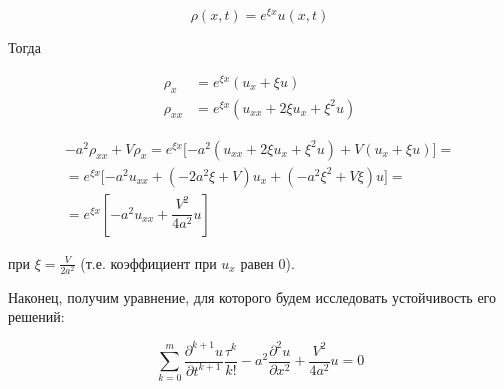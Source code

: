 \begin{equation*}
\rho (x,t) = e^{\xi x} u(x,t)
\end{equation*}

Тогда

\begin{align*}
\rho_x & = e^{\xi x} (u_x + \xi u)\\
\rho_{xx} & = e^{\xi x} (u_{xx} + 2 \xi u_x + \xi^2 u)
\end{align*}

\begin{align*}
- a^2 \rho_{xx} + V \rho_x = e^{\xi x} \lbrack -a^2 (u_{xx} + 2 \xi u_x + \xi^2 u) + V (u_x + \xi u) \rbrack = \\
= e^{\xi x} \lbrack -a^2 u_{xx} + (-2 a^2 \xi + V) u_x + (-a^2 \xi^2 + V \xi) u \rbrack = \\
= e^{\xi x} \left\lbrack -a^2 u_{xx} + \dfrac{V^2}{4a^2} u \right\rbrack
\end{align*}

при $\xi = \frac{V}{2a^2}$ (т.е. коэффициент при $u_x$ равен $0$).

Наконец, получим уравнение, для которого будем исследовать устойчивость его решений:

\begin{equation}\label{eq:final}
\sum\limits_{k=0}^{m} \dfrac{\partial^{k+1} u}{\partial t^{k+1}} \dfrac{\tau^k}{k!} - a^2 \dfrac{\partial^2 u}{\partial x^2} + \dfrac{V^2}{4a^2} u = 0
\end{equation}